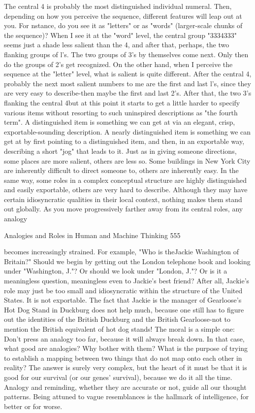 The central 4 is probably the most distinguished individual numeral. Then, depending
on how you perceive the sequence, different features will leap out at you. For nstance,
do you see it as "letters" or as "words" (larger-scale chunks of the sequence)? When I
see it at the "word" level, the central group "3334333" seems just a shade less salient
than the 4, and after that, perhaps, the two flanking groups of l's. The two groups of
3's by themselves come next. Only then do the groups of 2's get recognized. On the
other hand, when I perceive the sequence at the "letter" level, what is salient is quite
different. After the central 4, probably the next most salient numbers to me are the
first and last l's, since they are very easy to describe-then maybe the first and last 2's.
After that, the two 3's flanking the central 4but at this point it starts to get a little
harder to specify various items without resorting to such uninspired descriptions as
"the fourth term".
        A distinguished item is something we can get at via an elegant, crisp,
exportable-sounding description. A nearly distinguished item is something we can get
at by first pointing to a distinguished item, and then, in an exportable way, describing
a short "jog" that leads to it. Just as in giving someone directions, some places are
more salient, others are less so. Some buildings in New York City are inherently
difficult to direct someone to, others are inherently easy. In the same way, some roles
in a complex conceptual structure are highly distinguished and easily exportable,
others are very hard to describe. Although they may have certain idiosyncratic
qualities in their local context, nothing makes them stand out globally.
        As you move progressively farther away from its central roles, any analogy




Analogies and Roles in Human and Machine Thinking                                      555

becomes increasingly strained. For example, "Who is theJackie Washington of
Britain?" Should we begin by getting out the London telephone book and looking
under "Washington, J."? Or should we look under "London, J."? Or is it a
meaningless question, meaningless even to Jackie's best friend? After all, Jackie's role
may just be too small and idiosyncratic within the structure of the United States. It is
not exportable. The fact that Jackie is the manager of Gearloose's Hot Dog Stand in
Duckburg does not help much, because one still has to figure out the identities of the
British Duckburg and the British Gearloose-not to mention the British equivalent of
hot dog stands!
        The moral is a simple one: Don't press an analogy too far, because it will
always break down. In that case, what good are analogies? Why bother with them?
What is the purpose of trying to establish a mapping between two things that do not
map onto each other in reality? The answer is surely very complex, but the heart of it
must be that it is good for our survival (or our genes' survival), because we do it all
the time. Analogy and reminding, whether they are accurate or not, guide all our
thought patterns. Being attuned to vague resemblances is the hallmark of intelligence,
for better or for worse.

